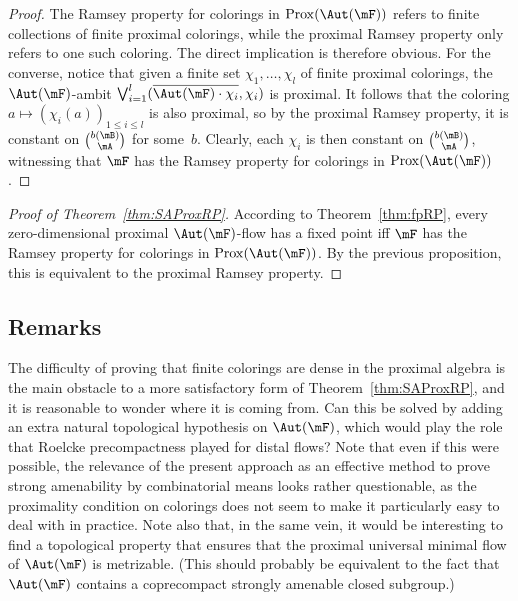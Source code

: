 \begin{proof}
The Ramsey property for colorings in $\mathrm{Prox}(\Aut(\mF))$ refers to finite collections of finite proximal colorings, while the proximal Ramsey property only refers to one such coloring. The direct implication is therefore obvious. For the converse, notice that given a finite set $\chi_{1},\ldots,\chi_{l}$ of finite proximal colorings, the $\Aut(\mF)$-ambit $\bigvee_{i=1}^{l} (\overline{\Aut(\mF)\cdot\chi_{i}},\chi_{i})$ is proximal. It follows that the coloring $a\mapsto (\chi_{i}(a))_{1\leq i\leq l}$ is also proximal, so by the proximal Ramsey property, it is constant on $\binom{b(\mB)}{\mA}$ for some~$b$. Clearly, each $\chi_{i}$ is then constant on $\binom{b(\mB)}{\mA}$, witnessing that $\mF$ has the Ramsey property for colorings in $\mathrm{Prox}(\Aut(\mF))$.
\end{proof}

\begin{proof}[Proof of Theorem~\ref{thm:SAProxRP}]
According to Theorem~\ref{thm:fpRP}, every zero-dimensional proximal $\Aut(\mF)$-flow has a fixed point iff $\mF$ has the Ramsey property for colorings in $\mathrm{Prox}(\Aut(\mF))$. By the previous proposition, this is equivalent to the proximal Ramsey property.
\end{proof}


\subsection{Remarks}
\label{subsection:RksProx}

The difficulty of proving that finite colorings are dense in the proximal algebra is the main obstacle to a more satisfactory form of Theorem~\ref{thm:SAProxRP}, and it is reasonable to wonder where it is coming from. Can this be solved by adding an extra natural topological hypothesis on $\Aut(\mF)$, which would play the role that Roelcke precompactness played for distal flows? Note that even if this were possible, the relevance of the present approach as an effective method to prove strong amenability by combinatorial means looks rather questionable, as the proximality condition on colorings does not seem to make it particularly easy to deal with in practice. Note also that, in the same vein, it would be interesting to find a topological property that ensures that the proximal universal minimal flow of $\Aut(\mF)$ is metrizable. (This should probably be equivalent to the fact that $\Aut(\mF)$ contains a coprecompact strongly amenable closed subgroup.)

